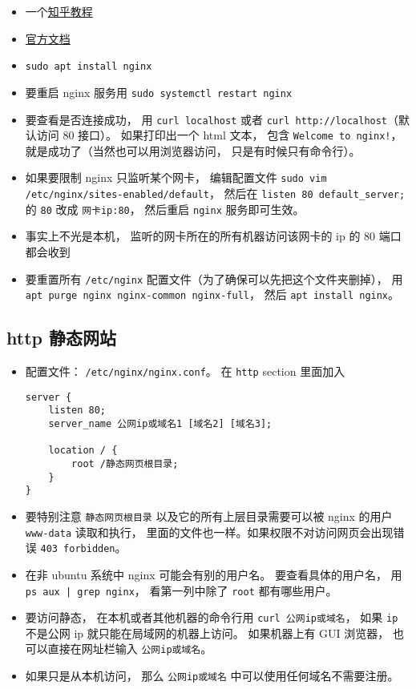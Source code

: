 
\begin{issues}
\issueDraft
\end{issues}

\begin{itemize}
\item 一个\href{https://zhuanlan.zhihu.com/p/80600540}{知乎教程}
\item \href{https://nginx.org/en/docs/}{官方文档}
\item \verb|sudo apt install nginx|
\item 要重启 nginx 服务用 \verb|sudo systemctl restart nginx|
\item 要查看是否连接成功， 用 \verb|curl localhost| 或者 \verb|curl http://localhost|（默认访问 80 接口）。 如果打印出一个 html 文本， 包含 \verb|Welcome to nginx!|， 就是成功了（当然也可以用浏览器访问， 只是有时候只有命令行）。
\item 如果要限制 nginx 只监听某个网卡， 编辑配置文件 \verb|sudo vim /etc/nginx/sites-enabled/default|， 然后在 \verb|listen 80 default_server;| 的 \verb|80| 改成 \verb|网卡ip:80|， 然后重启 \verb|nginx| 服务即可生效。
\item 事实上不光是本机， 监听的网卡所在的所有机器访问该网卡的 ip 的 80 端口都会收到
\item 要重置所有 \verb|/etc/nginx| 配置文件（为了确保可以先把这个文件夹删掉）， 用 \verb|apt purge nginx nginx-common nginx-full|， 然后 \verb|apt install nginx|。
\end{itemize}

\subsection{http 静态网站}
\begin{itemize}
\item 配置文件： \verb|/etc/nginx/nginx.conf|。 在 \verb|http| section 里面加入
\begin{lstlisting}[language=none]
server {
    listen 80;
    server_name 公网ip或域名1 [域名2] [域名3];
    
    location / {
        root /静态网页根目录;
    }
}
\end{lstlisting}
\item 要特别注意 \verb|静态网页根目录| 以及它的所有上层目录需要可以被 nginx 的用户 \verb|www-data| 读取和执行， 里面的文件也一样。如果权限不对访问网页会出现错误 \verb|403 forbidden|。
\item 在非 ubuntu 系统中 nginx 可能会有别的用户名。  要查看具体的用户名， 用 \verb`ps aux | grep nginx`， 看第一列中除了 \verb|root| 都有哪些用户。
\item 要访问静态， 在本机或者其他机器的命令行用 \verb|curl 公网ip或域名|， 如果 \verb|ip| 不是公网 ip 就只能在局域网的机器上访问。 如果机器上有 GUI 浏览器， 也可以直接在网址栏输入 \verb|公网ip或域名|。
\item 如果只是从本机访问， 那么 \verb|公网ip或域名| 中可以使用任何域名不需要注册。
\end{itemize}

